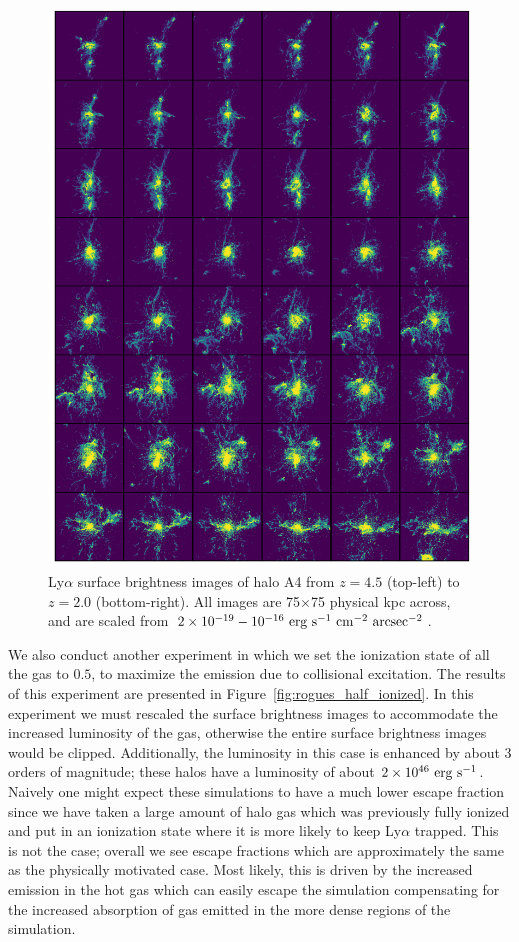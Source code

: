 \begin{figure}
    \centering
    \includegraphics[width=\textwidth,height=0.9\textheight,keepaspectratio]{figures/rogues_fully_ionized.png}
    \caption{
        Ly$\alpha$ surface brightness images of halo A4 from $z=4.5$ (top-left) to $z=2.0$ (bottom-right).
        All images are 75$\times$75 physical kpc across, and are scaled from $2\times10^{-19}-10^{-16}\ \rm{erg}\ \rm{s}^{-1}\ \rm{cm}^{-2}\ \rm{arcsec}^{-2}$.
    }
  \label{fig:rogues_fully_ionized}
\end{figure}


We also conduct another experiment in which we set the ionization state of all the gas to $0.5$, to maximize the emission due to collisional excitation.
The results of this experiment are presented in Figure~\ref{fig:rogues_half_ionized}.
In this experiment we must rescaled the surface brightness images to accommodate the increased luminosity of the gas, otherwise the entire surface brightness images would be clipped.
Additionally, the luminosity in this case is enhanced by about 3 orders of magnitude; these halos have a luminosity of about $2\times10^{46}\ \rm{erg}\ \rm{s}^{-1}$.
Naively one might expect these simulations to have a much lower escape fraction since we have taken a large amount of halo gas which was previously fully ionized and put in an ionization state where it is more likely to keep Ly$\alpha$ trapped.
This is not the case; overall we see escape fractions which are approximately the same as the physically motivated case.
Most likely, this is driven by the increased emission in the hot gas which can easily escape the simulation compensating for the increased absorption of gas emitted in the more dense regions of the simulation.

